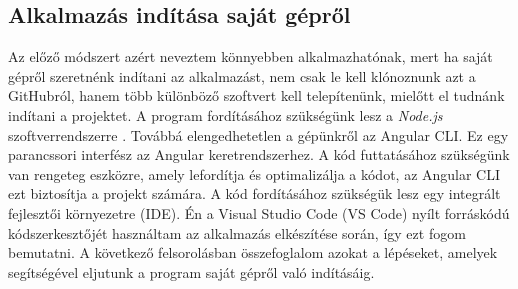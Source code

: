 \subsection{Alkalmazás indítása saját gépről}
Az előző  módszert azért neveztem könnyebben alkalmazhatónak, mert ha saját gépről szeretnénk indítani az alkalmazást, nem csak le kell klónoznunk azt a GitHubról, hanem több különböző szoftvert kell telepítenünk, mielőtt el tudnánk indítani a projektet. A program fordításához szükségünk lesz a \textit{Node.js} szoftverrendszerre \cite{nodejs:online}. Továbbá elengedhetetlen a gépünkről az Angular CLI\cite{cli}. Ez egy parancssori interfész az Angular keretrendszerhez. A kód futtatásához szükségünk van rengeteg eszközre, amely lefordítja és optimalizálja a kódot, az Angular CLI ezt biztosítja a projekt számára. A kód fordításához szükségük lesz egy integrált fejlesztői környezetre (IDE). Én a Visual Studio Code\cite{vs:code} (VS Code) nyílt forráskódú kódszerkesztőjét használtam az alkalmazás elkészítése során, így ezt fogom bemutatni. A következő felsorolásban összefoglalom azokat a lépéseket, amelyek segítségével eljutunk a program saját gépről való indításáig. 

